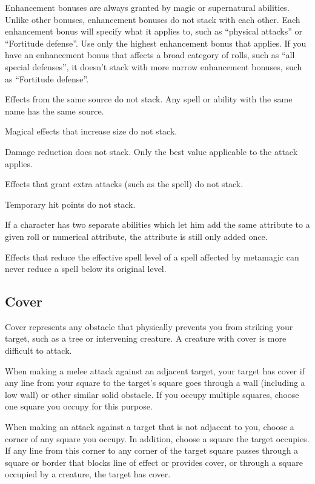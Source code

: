  Enhancement bonuses are always granted by magic or supernatural abilities. Unlike other bonuses, enhancement bonuses do not stack with each other. Each enhancement bonus will specify what it applies to, such as ``physical attacks'' or ``Fortitude defense''. Use only the highest enhancement bonus that applies. If you have an enhancement bonus that affects a broad category of rolls, such as ``all special defenses'', it doesn't stack with more narrow enhancement bonuses, such as ``Fortitude defense''.


\begin{itemize*}
    \item Effects from the same source do not stack. Any spell or ability with the same name has the same source. 
    \item Magical effects that increase size do not stack.
    \item Damage reduction does not stack. Only the best value applicable to the attack applies.
    \item Effects that grant extra attacks (such as the  spell) do not stack.
    \item Temporary hit points do not stack.
    \item If a character has two separate abilities which let him add the same attribute to a given roll or numerical attribute, the attribute is still only added once.
    \item Effects that reduce the effective spell level of a spell affected by metamagic can never reduce a spell below its original level.
\end{itemize*}

\subsection{Cover}\label{Cover}

Cover represents any obstacle that physically prevents you from striking your target, such as a tree or intervening creature. A creature with cover is more difficult to attack.

 When making a melee attack against an adjacent target, your target has cover if any line from your square to the target's square goes through a wall (including a low wall) or other similar solid obstacle. If you occupy multiple squares, choose one square you occupy for this purpose.

When making an attack against a target that is not adjacent to you, choose a corner of any square you occupy. In addition, choose a square the target occupies. If any line from this corner to any corner of the target square passes through a square or border that blocks line of effect or provides cover, or through a square occupied by a creature, the target has cover.

